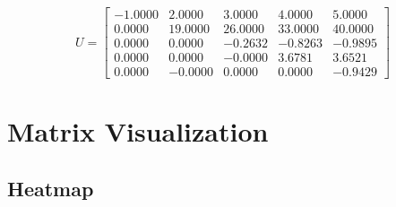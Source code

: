 \documentclass{article}
\begin{document}
\[U
 = \begin{bmatrix}
-1.0000 & 2.0000 & 3.0000 & 4.0000 & 5.0000 \\
0.0000 & 19.0000 & 26.0000 & 33.0000 & 40.0000 \\
0.0000 & 0.0000 & -0.2632 & -0.8263 & -0.9895 \\
0.0000 & 0.0000 & -0.0000 & 3.6781 & 3.6521 \\
0.0000 & -0.0000 & 0.0000 & 0.0000 & -0.9429
\end{bmatrix}
\]

\section{Matrix Visualization}
\subsection{Heatmap}
\end{document}
